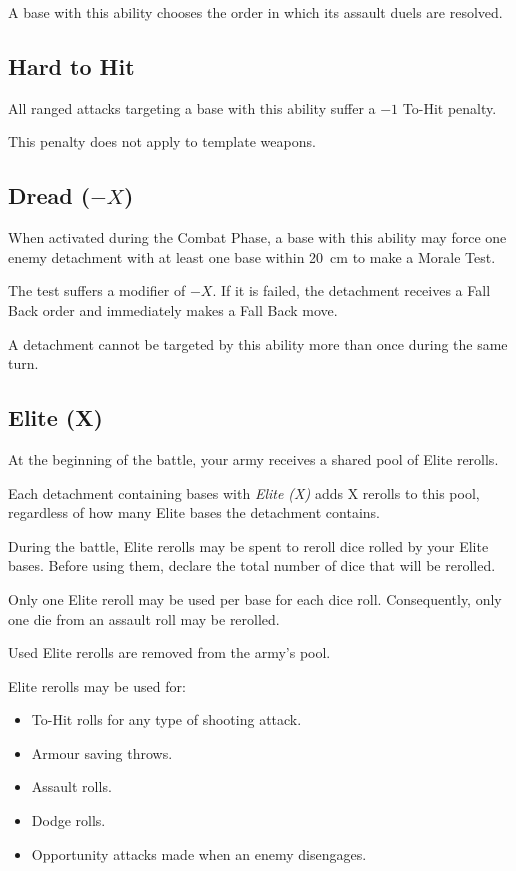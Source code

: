 A base with this ability chooses the order in which its assault duels are resolved.

\subsection{Hard to Hit}

All ranged attacks targeting a base with this ability suffer a $-1$ To-Hit penalty.

This penalty does not apply to template weapons.

\subsection{Dread ($-X$)}

When activated during the Combat Phase, a base with this ability may force one enemy detachment with at least one base within 20~cm to make a Morale Test.

The test suffers a modifier of $-X$. If it is failed, the detachment receives a Fall Back order and immediately makes a Fall Back move.

A detachment cannot be targeted by this ability more than once during the same turn.

\subsection{Elite (X)}

At the beginning of the battle, your army receives a shared pool of Elite rerolls.

Each detachment containing bases with \textit{Elite (X)} adds X rerolls to this pool, regardless of how many Elite bases the detachment contains.

During the battle, Elite rerolls may be spent to reroll dice rolled by your Elite bases. Before using them, declare the total number of dice that will be rerolled.

Only one Elite reroll may be used per base for each dice roll. Consequently, only one die from an assault roll may be rerolled.

Used Elite rerolls are removed from the army's pool.

Elite rerolls may be used for:

\begin{itemize}
    \item To-Hit rolls for any type of shooting attack.
    \item Armour saving throws.
    \item Assault rolls.
    \item Dodge rolls.
    \item Opportunity attacks made when an enemy disengages.
\end{itemize}

